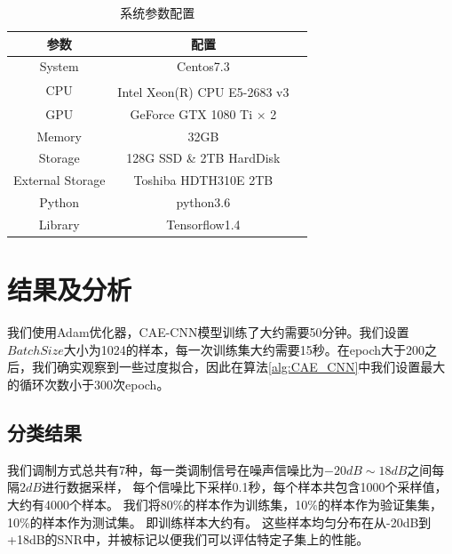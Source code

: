 
\begin{table}[H]
	\centering
	\caption{系统参数配置}
	\begin{tabular}{ccc}
		\toprule
		参数 & 配置\\
		\midrule
		System & Centos7.3\\
		\midrule
		CPU & Intel\textsuperscript{\textregistered}  Xeon(R) CPU E5-2683 v3 \\
		\midrule
		GPU & GeForce GTX 1080 Ti $\times$ 2\\
		\midrule 
		Memory & 32GB\\
		\midrule 
		Storage & 128G SSD \& 2TB HardDisk\\
		\midrule
		External Storage & Toshiba HDTH310E 2TB\\
		\midrule 
		Python & python3.6\\
		\midrule 
		Library & Tensorflow1.4\\
		\bottomrule
	\end{tabular}
	\label{sec:table_3_1}  
\end{table}

\section{结果及分析}
我们使用Adam优化器，CAE-CNN模型训练了大约需要50分钟。我们设置$BatchSize$大小为1024的样本，每一次训练集大约需要15秒。在epoch大于200之后，我们确实观察到一些过度拟合，因此在算法\ref{alg:CAE_CNN}中我们设置最大的循环次数小于300次epoch。\par

\subsection{分类结果}
我们调制方式总共有7种，每一类调制信号在噪声信噪比为$-20dB \sim 18dB$之间每隔$2dB$进行数据采样，
每个信噪比下采样0.1秒，每个样本共包含1000个采样值，大约有4000个样本。
我们将80\%的样本作为训练集，10\%的样本作为验证集集，10\%的样本作为测试集。
即训练样本大约有。 这些样本均匀分布在从-20dB到+18dB的SNR中，并被标记以便我们可以评估特定子集上的性能。\par

